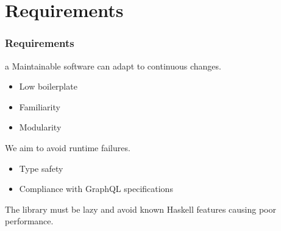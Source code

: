 \section{Requirements}

\begin{frame}\frametitle{Requirements}  

\begin{itemize}
     a Maintainable software can adapt to continuous changes.
    \begin{itemize}
        \item Low boilerplate
        \item Familiarity
        \item Modularity
    \end{itemize}
     We aim to avoid runtime failures. 
    \begin{itemize}
        \item Type safety    
        \item Compliance with GraphQL specifications
    \end{itemize}
     The library must be lazy and avoid known Haskell features causing poor performance.
\end{itemize}

\end{frame}